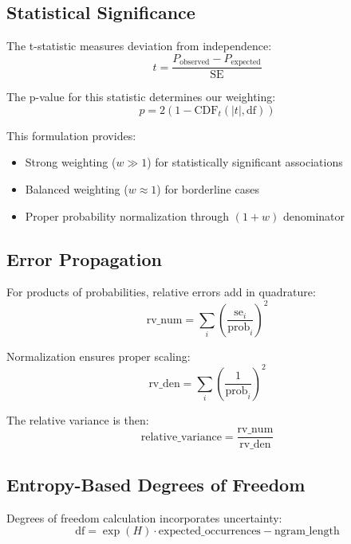 \documentclass[12pt,a4paper]{article}
\begin{document}
\subsection{Statistical Significance}
The t-statistic measures deviation from independence:
\begin{equation}
    t = \frac{P_{\text{observed}} - P_{\text{expected}}}{\text{SE}}
\end{equation}

The p-value for this statistic determines our weighting:
\begin{equation}
    p = 2(1 - \text{CDF}_t(|t|, \text{df}))
\end{equation}

This formulation provides:
\begin{itemize}
    \item Strong weighting ($w \gg 1$) for statistically significant associations
    \item Balanced weighting ($w \approx 1$) for borderline cases
    \item Proper probability normalization through $(1+w)$ denominator
\end{itemize}

\subsection{Error Propagation}
For products of probabilities, relative errors add in quadrature:
\begin{equation}
    \text{rv\_num} = \sum_i \left(\frac{\text{se}_i}{\text{prob}_i}\right)^2
\end{equation}

Normalization ensures proper scaling:
\begin{equation}
    \text{rv\_den} = \sum_i \left(\frac{1}{\text{prob}_i}\right)^2
\end{equation}

The relative variance is then:
\begin{equation}
    \text{relative\_variance} = \frac{\text{rv\_num}}{\text{rv\_den}}
\end{equation}

\subsection{Entropy-Based Degrees of Freedom}
Degrees of freedom calculation incorporates uncertainty:
\begin{equation}
    \text{df} = \exp(H) \cdot \text{expected\_occurrences} - \text{ngram\_length}
\end{equation}
\end{document}
